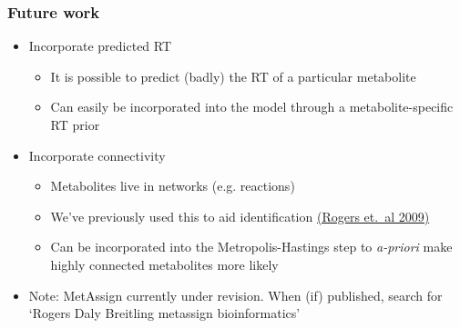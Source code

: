 \begin{frame}
	\frametitle{Future work}
	\begin{itemize}
		\item Incorporate predicted \ac{RT}
		\begin{itemize}
			\item It is possible to predict (badly) the \ac{RT} of a particular metabolite
			\item Can easily be incorporated into the model through a metabolite-specific \ac{RT} prior
		\end{itemize}
		\item<2-> Incorporate connectivity
		\begin{itemize}
			\item Metabolites live in networks (e.g. reactions)
			\item We've previously used this to aid identification \href{http://dx.doi.org/10.1093/bioinformatics/btn642}{(Rogers et.~al 2009)}
			\item Can be incorporated into the Metropolis-Hastings step to \emph{a-priori} make highly connected metabolites more likely
		\end{itemize}
		\item<3-> Note: MetAssign currently under revision. When (if) published, search for `Rogers Daly Breitling metassign bioinformatics' 
	\end{itemize}
\end{frame}